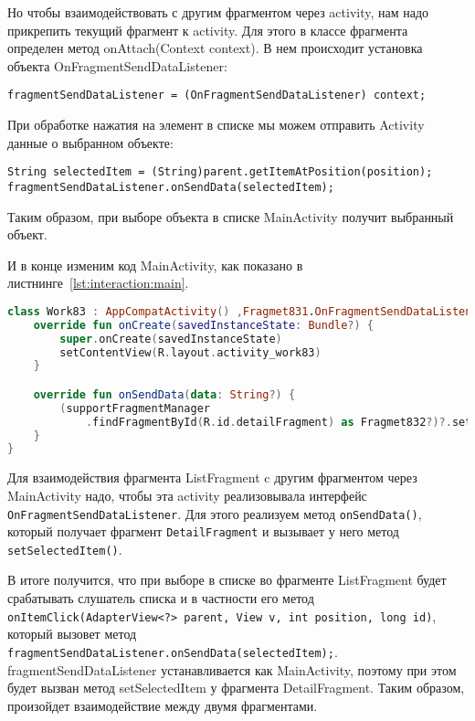 Но чтобы взаимодействовать с другим фрагментом через activity, нам надо
прикрепить текущий фрагмент к activity. Для этого в классе фрагмента
определен метод onAttach(Context context). В нем происходит установка
объекта OnFragmentSendDataListener:

\begin{verbatim}
fragmentSendDataListener = (OnFragmentSendDataListener) context;
\end{verbatim}

При обработке нажатия на элемент в списке мы можем отправить Activity
данные о выбранном объекте:

\begin{verbatim}
String selectedItem = (String)parent.getItemAtPosition(position);
fragmentSendDataListener.onSendData(selectedItem);
\end{verbatim}

Таким образом, при выборе объекта в списке MainActivity получит
выбранный объект.

И в конце изменим код MainActivity, как показано
в листнинге~\ref{lst:interaction:main}.

\begin{lstlisting}[language=Kotlin
	, caption=\leftline{}
	, label=lst:interaction:main
	]
class Work83 : AppCompatActivity() ,Fragmet831.OnFragmentSendDataListener {
    override fun onCreate(savedInstanceState: Bundle?) {
        super.onCreate(savedInstanceState)
        setContentView(R.layout.activity_work83)
    }

    override fun onSendData(data: String?) {
        (supportFragmentManager
            .findFragmentById(R.id.detailFragment) as Fragmet832?)?.setSelectedItem(data)
    }
}
\end{lstlisting}

Для взаимодействия фрагмента ListFragment c другим фрагментом через
MainActivity надо, чтобы эта activity реализовывала интерфейс
\texttt{OnFragmentSendDataListener}. Для этого реализуем метод
\texttt{onSendData()},
который получает фрагмент \texttt{DetailFragment} и вызывает у него метод
\texttt{setSelectedItem()}.\par
В итоге получится, что при выборе в списке во фрагменте ListFragment будет
срабатывать слушатель списка и в частности его метод
\texttt{onItemClick(AdapterView<?> parent, View v, int position, long id)},
который вызовет метод
\texttt{fragmentSendDataListener.onSendData(selectedItem);}.
fragmentSendDataListener устанавливается как MainActivity, поэтому при
этом будет вызван метод setSelectedItem у фрагмента DetailFragment. Таким
образом, произойдет взаимодействие между двумя фрагментами.

